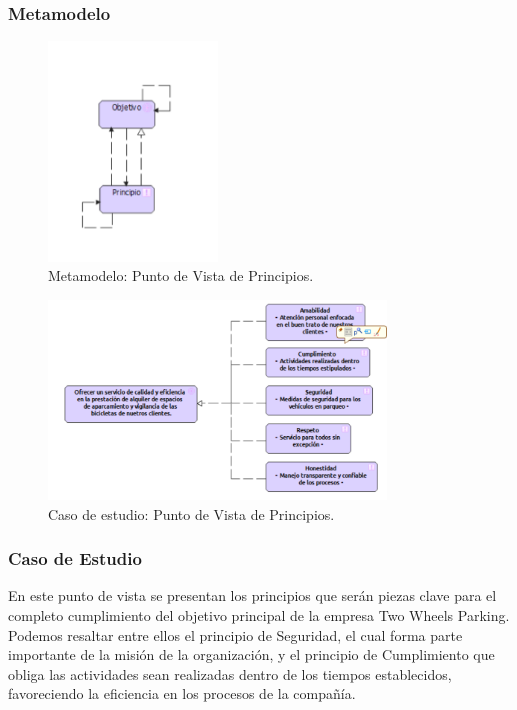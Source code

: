 \subsubsection{Metamodelo}
\begin{figure}[h]
	\centering
	\includegraphics[width=0.4\textwidth]{imagenes/Metamodelos/Motivacion/meta_Principios.pdf}
	\caption{Metamodelo: Punto de Vista de Principios.}
	\label{fig:gap_analysis}
\end{figure}

\begin{figure}[h]
	\centering
	\includegraphics[width=0.8\textwidth]{imagenes/Caso_Estudio/Motivacion/Principios.PDF}
	\caption{Caso de estudio: Punto de Vista de Principios.}
	\label{fig:gap_analysis}
\end{figure}

\subsubsection{Caso de Estudio}
En este punto de vista se presentan los principios que serán piezas clave para el completo cumplimiento del objetivo principal de la empresa Two Wheels Parking. Podemos resaltar entre ellos el principio de Seguridad, el cual forma parte importante de la misión de la organización, y el principio de Cumplimiento que obliga las actividades sean realizadas dentro de los tiempos establecidos, favoreciendo la eficiencia en los procesos de la compañía.

